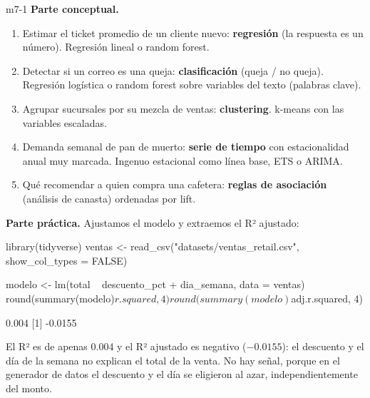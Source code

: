 
\begin{solucion}{m7-1}
\textbf{Parte conceptual.}
\begin{enumerate}[label=(\alph*)]
  \item Estimar el ticket promedio de un cliente nuevo: \textbf{regresión}
        (la respuesta es un número). Regresión lineal o random forest.
  \item Detectar si un correo es una queja: \textbf{clasificación} (queja /
        no queja). Regresión logística o random forest sobre variables del
        texto (palabras clave).
  \item Agrupar sucursales por su mezcla de ventas: \textbf{clustering}.
        k-means con las variables escaladas.
  \item Demanda semanal de pan de muerto: \textbf{serie de tiempo} con
        estacionalidad anual muy marcada. Ingenuo estacional como línea base,
        ETS o ARIMA.
  \item Qué recomendar a quien compra una cafetera: \textbf{reglas de
        asociación} (análisis de canasta) ordenadas por lift.
\end{enumerate}

\textbf{Parte práctica.} Ajustamos el modelo y extraemos el R² ajustado:

\begin{rcode}
library(tidyverse)
ventas <- read_csv("datasets/ventas_retail.csv", show_col_types = FALSE)

modelo <- lm(total ~ descuento_pct + dia_semana, data = ventas)
round(summary(modelo)$r.squared, 4)
round(summary(modelo)$adj.r.squared, 4)
\end{rcode}

\begin{rsalida}
[1] 0.004
[1] -0.0155
\end{rsalida}

El R² es de apenas 0.004 y el R² ajustado es negativo ($-0.0155$): el
descuento y el día de la semana no explican el total de la venta. No hay
señal, porque en el generador de datos el descuento y el día se eligieron al
azar, independientemente del monto.
\end{solucion}

